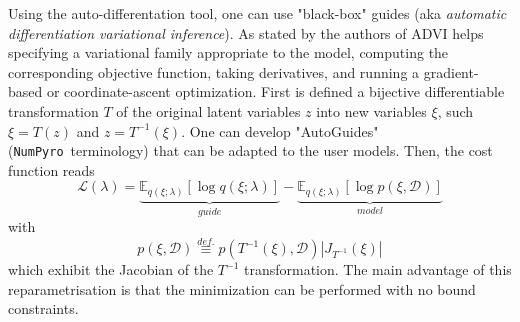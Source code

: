 \documentclass[final,5p,times,twocolumn,authoryear]{elsarticle}
\newcommand{\numpyro}{\texttt{NumPyro}}
\newcommand{\bydef}{\overset{def.}{\equiv}}
\begin{document}
Using the auto-differentation tool, one can use "black-box" guides (aka \textit{automatic differentiation variational inference}). As stated by the authors of \citep{2016arXiv160300788K} ADVI helps specifying a variational family appropriate to the model, computing the corresponding objective
function, taking derivatives, and running a gradient-based or coordinate-ascent optimization. First is defined a bijective differentiable transformation $T$ of the original latent variables $z$ into new variables $\xi$, such $\xi=T(z)$ and $z=T^{-1}(\xi)$. One can develop "AutoGuides" (\numpyro\ terminology) that can be adapted to the user models. Then, the cost function reads
\begin{equation}
\mathcal{L}(\lambda) = \underbrace{\mathbb{E}_{q(\xi;\lambda)}\left[ \log q(\xi;\lambda)\right]}_{guide} - \underbrace{\mathbb{E}_{q(\xi;\lambda)}\left[ \log p(\xi,\mathcal{D}) \right]}_{model}
\label{eq-loss-svi-2}
\end{equation}
with
\begin{equation}
p(\xi,\mathcal{D}) \bydef p(T^{-1}(\xi),\mathcal{D}) |J_{T^{-1}}(\xi)|
\end{equation}
which exhibit the Jacobian of the $T^{-1}$ transformation. The main advantage of this reparametrisation is that the minimization can be performed with no bound constraints. 
\end{document}
